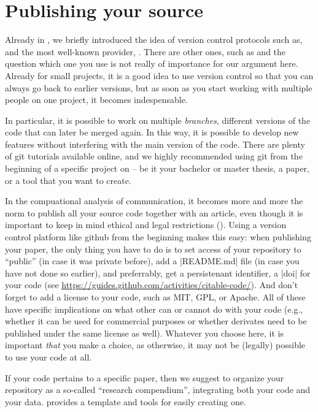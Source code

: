 \section{Publishing your source}
\label{sec:publishingsource}

Already in , we briefly introduced the idea of
version control protocols such as, and the most well-known
provider, . There are other ones, such as 
and the question which one you use is not really of importance for our
argument here. Already for small projects, it is a good idea to use
version control so that you can always go back to earlier versions,
but as soon as you start working with multiple people on one project,
it becomes indespensable.

In particular, it is possible to work on multiple \emph{branches},
different versions of the code that can later be merged again. In this
way, it is possible to develop new features without interfering with
the main version of the code. There are plenty of git tutorials
available online, and we highly recommended using git from the
beginning of a specific project on -- be it your bachelor or master
thesis, a paper, or a tool that you want to create.

In the compuational analysis of communication, it becomes more and
more the norm to publish all your source code together with an
article, even though it is important to keep in mind ethical and legal
restrictions (\cite{VanAtteveldt2019}). Using a version control
platform like github from the beginning makes this easy: when
publishing your paper, the only thing you have to do is to set access
of your repository to ``public'' (in case it was private before), add
a |README.md| file (in case you have not done so earlier), and
preferrably, get a persistenant identifier, a |doi| for your
code (see \url{https://guides.github.com/activities/citable-code/}).
And don't forget to add a license to your code, such as MIT, GPL, or
Apache. All of these have specific implications on what other can or
cannot do with your code (e.g., whether it can be used for commercial
purposes or whether derivates need to be published under the same license
as well). Whatever you choose here, it is important \emph{that} you
make a choice, as otherwise, it may not be (legally) possible to use
your code at all. 

If your code pertains to a specific paper, then we suggest to organize
your repository as a so-called ``research compendium'', integrating
both your code and your data.
\cite{compendium} provides a template and tools for easily creating one.

